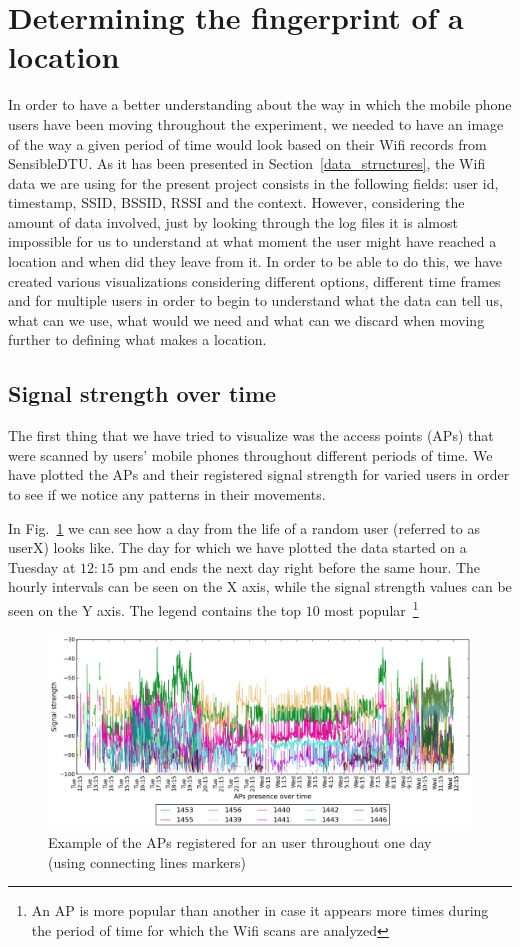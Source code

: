 \section{Determining the fingerprint of a location}
In order to have a better understanding about the way in which the mobile phone
users have been moving throughout the experiment, we needed to have an image of
the way a given period of time would look based on their Wifi records from
SensibleDTU. As it has been presented in Section~\ref{data_structures}, the Wifi
data we are using for the present project consists in the following fields:
user id, timestamp, SSID, BSSID, RSSI and the context. However, considering the
amount of data involved, just by looking through the log files it is almost
impossible for us to understand at what moment the user might have reached a
location and when did they leave from it. In order to be able to do this, we
have created various visualizations considering different options, different
time frames and for multiple users in order to begin to understand what the data
can tell us, what can we use, what would we need and what can we discard when
moving further to defining what makes a location.

\subsection{Signal strength over time}

The first thing that we have tried to visualize was the access points (APs) that
were scanned by users' mobile phones throughout different periods of time. We
have plotted the APs and their registered signal strength for varied users in
order to see if we notice any patterns in their movements.

In Fig.~\ref{user_6_1d_lines} we can see how a day from the life of a random
user (referred to as userX) looks like. The day for which we have plotted the
data started on a Tuesday at $12:15$ pm and ends the next day right before the
same hour. The hourly intervals can be seen on the X axis, while the signal
strength values can be seen on the Y axis. The legend contains the top $10$ most
popular~\footnote{An AP is more popular than another in case it appears more
times during the period of time for which the Wifi scans are analyzed}

\begin{figure}[h]
\centering
\includegraphics[width
=\textwidth, height =
0.4\textwidth]{figures/user_6_sorted_1days_plot.png}
\caption{Example of the APs registered for an user throughout one day (using
connecting lines markers)}
\label{user_6_1d_lines}
\end{figure}

